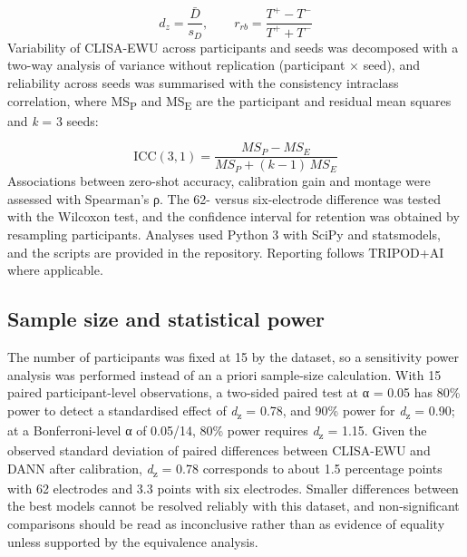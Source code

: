 \begin{equation}
  d_z=\frac{\bar{D}}{s_D},\qquad r_{rb}=\frac{T^{+}-T^{-}}{T^{+}+T^{-}}
  \label{eq:effect}
\end{equation}
Variability of CLISA-EWU across participants and seeds was decomposed with a two-way analysis of variance without replication (participant × seed), and reliability across seeds was summarised with the consistency intraclass correlation\cite{shrout}, where MS\textsubscript{P} and MS\textsubscript{E} are the participant and residual mean squares and \emph{k} = 3 seeds:

\begin{equation}
  \mathrm{ICC}(3,1)=\frac{MS_P-MS_E}{MS_P+(k-1)\,MS_E}
  \label{eq:icc}
\end{equation}
Associations between zero-shot accuracy, calibration gain and montage were assessed with Spearman’s ρ. The 62- versus six-electrode difference was tested with the Wilcoxon test, and the confidence interval for retention was obtained by resampling participants. Analyses used Python 3 with SciPy and statsmodels, and the scripts are provided in the repository. Reporting follows TRIPOD+AI where applicable\cite{tripod}.


\subsection{Sample size and statistical power}
The number of participants was fixed at 15 by the dataset, so a sensitivity power analysis was performed instead of an a priori sample-size calculation. With 15 paired participant-level observations, a two-sided paired test at α = 0.05 has 80\% power to detect a standardised effect of \emph{d}\textsubscript{z} = 0.78, and 90\% power for \emph{d}\textsubscript{z} = 0.90; at a Bonferroni-level α of 0.05/14, 80\% power requires \emph{d}\textsubscript{z} = 1.15. Given the observed standard deviation of paired differences between CLISA-EWU and DANN after calibration, \emph{d}\textsubscript{z} = 0.78 corresponds to about 1.5 percentage points with 62 electrodes and 3.3 points with six electrodes. Smaller differences between the best models cannot be resolved reliably with this dataset, and non-significant comparisons should be read as inconclusive rather than as evidence of equality unless supported by the equivalence analysis.


